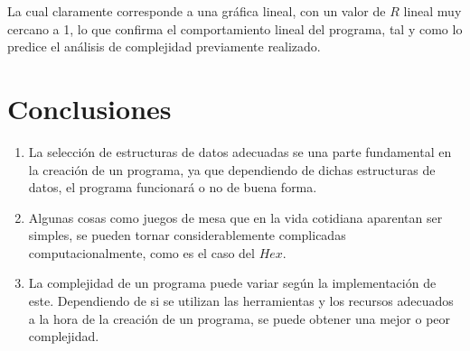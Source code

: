 \documentclass[12pt,letterpaper]{article}
\begin{document}
La cual claramente corresponde a una gráfica lineal, con un valor de $R$ lineal muy cercano a 1, lo que confirma el comportamiento lineal del programa, tal y como lo predice el análisis de complejidad previamente realizado.


\section{Conclusiones}
\begin{enumerate}
\item La selección de estructuras de datos adecuadas se una parte fundamental en la creación de un programa, ya que dependiendo de dichas estructuras de datos, el programa funcionará o no de buena forma.

\item Algunas cosas como juegos de mesa que en la vida cotidiana aparentan ser simples, se pueden tornar considerablemente complicadas computacionalmente, como es el caso del $Hex$.

\item La complejidad de un programa puede variar según la implementación de este. Dependiendo de si se utilizan las herramientas y los recursos adecuados a la hora de la creación de un programa, se puede obtener una mejor o peor complejidad.
\end{enumerate}
\end{document}
